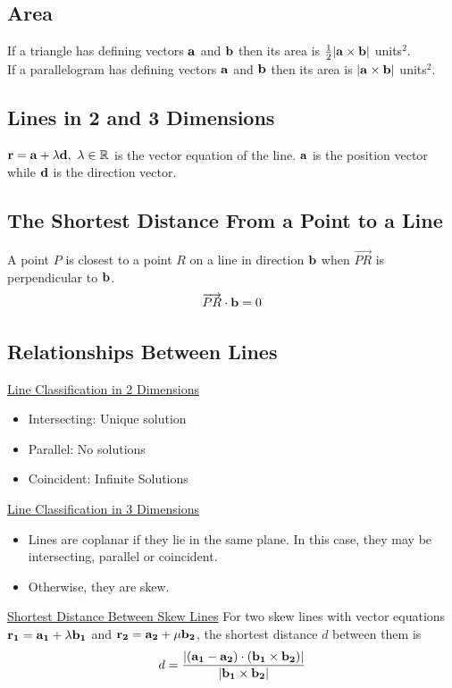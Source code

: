 \documentclass[10pt, a4paper, titlepage]{article}
\newcommand{\mbb}[1]{\mathbb{#1}}
\begin{document}
\begin{multicols*}{3}
	\dotfill
	\subsection{Area}
	If a triangle has defining vectors $\vb{a}$ and $\vb{b}$ then its area is $\frac{1}{2}|\vb{a}\times\vb{b}|$ units$^2$.\\
	If a parallelogram has defining vectors $\vb{a}$ and $\vb{b}$ then its area is $|\vb{a}\times\vb{b}|$ units$^2$.
	
	\dotfill
	\subsection{Lines in 2 and 3 Dimensions}
	$\vb{r}=\vb{a}+\lambda\vb{d},\ \lambda\in\mbb{R}$ is the vector equation of the line. $\vb{a}$ is the position vector while $\vb{d}$ is the direction vector.

	\dotfill
	\subsection{The Shortest Distance From a Point to a Line}
	A point $P$ is closest to a point $R$ on a line in direction $\vb{b}$ when $\overrightarrow{PR}$ is perpendicular to $\vb{b}$.
	\begin{align}
		\overrightarrow{PR}\cdot\vb{b}=0
	\end{align}

	\dotfill
	\subsection{Relationships Between Lines}
	\underline{Line Classification in 2 Dimensions}
	\begin{itemize}
		\item Intersecting: Unique solution
		\item Parallel: No solutions
		\item Coincident: Infinite Solutions
	\end{itemize}
	\underline{Line Classification in 3 Dimensions}
	\begin{itemize}
		\item Lines are coplanar if they lie in the same plane. In this case, they may be intersecting, parallel or coincident.
		\item Otherwise, they are skew.
	\end{itemize}
	\underline{Shortest Distance Between Skew Lines}
	For two skew lines with vector equations $\vb{r_1}=\vb{a_1}+\lambda\vb{b_1}$ and $\vb{r_2}=\vb{a_2}+\mu\vb{b_2}$, the shortest distance $d$ between them is
	\begin{align}
		d=\frac{|(\vb{a_1}-\vb{a_2})\cdot(\vb{b_1}\times\vb{b_2})|}{|\vb{b_1}\times\vb{b_2}|}
	\end{align}


\end{multicols*}
\end{document}
